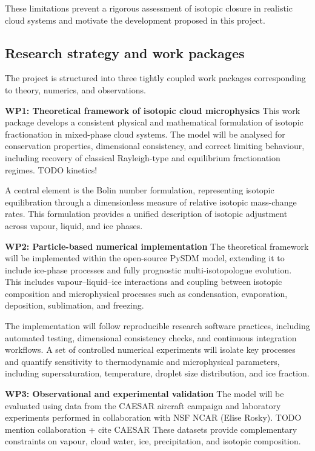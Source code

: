 \documentclass[12pt]{article}
\begin{document}
These limitations prevent a rigorous assessment of isotopic closure in realistic cloud systems
and motivate the development proposed in this project.

\subsection{Research strategy and work packages}
The project is structured into three tightly coupled work packages corresponding to theory,
numerics, and observations.

\textbf{WP1: Theoretical framework of isotopic cloud microphysics}
This work package develops a consistent physical and mathematical formulation of isotopic fractionation
in mixed-phase cloud systems.
The model will be analysed for conservation properties, dimensional consistency,
and correct limiting behaviour, including recovery of classical Rayleigh-type
and equilibrium fractionation regimes.
TODO kinetics!

A central element is the Bolin number formulation, representing isotopic equilibration
through a dimensionless measure of relative isotopic mass-change rates.
This formulation provides a unified description of isotopic adjustment across vapour, liquid, and ice phases.

\textbf{WP2: Particle-based numerical implementation}
The theoretical framework will be implemented within the open-source PySDM model,
extending it to include ice-phase processes and fully prognostic multi-isotopologue evolution.
This includes vapour–liquid–ice interactions and coupling between isotopic composition
and microphysical processes such as condensation, evaporation, deposition, sublimation, and freezing.

The implementation will follow reproducible research software practices, including automated testing,
dimensional consistency checks, and continuous integration workflows.
A set of controlled numerical experiments will isolate key processes and quantify sensitivity
to thermodynamic and microphysical parameters, including supersaturation, temperature, 
droplet size distribution, and ice fraction.

\textbf{WP3: Observational and experimental validation}
The model will be evaluated using data from the CAESAR aircraft campaign and laboratory experiments
performed in collaboration with NSF NCAR (Elise Rosky).
    {\color{red}TODO mention collaboration} \cite{Rosky2025MixedPhaseIsotopes} + cite CAESAR
These datasets provide complementary constraints on vapour, cloud water, ice, precipitation,
and isotopic composition.
\end{document}
